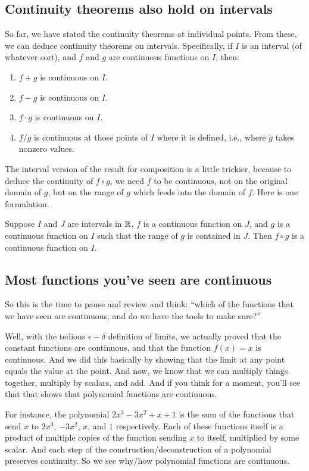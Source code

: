 \documentclass[10pt]{amsart}
\begin{document}
\subsection{Continuity theorems also hold on intervals}

So far, we have stated the continuity theorems at individual
points. From these, we can deduce continuity theorems on
intervals. Specifically, if $I$ is an interval (of whatever sort), and
$f$ and $g$ are continuous functions on $I$, then:

\begin{enumerate}
\item $f + g$ is continuous on $I$.
\item $f - g$ is continuous on $I$.
\item $f \cdot g$ is continuous on $I$.
\item $f/g$ is continuous at those points of $I$ where it is defined,
  i.e., where $g$ takes nonzero values.
\end{enumerate}

The interval version of the result for composition is a little
trickier, because to deduce the continuity of $f \circ g$, we need $f$
to be continuous, not on the original domain of $g$, but on the range
of $g$ which feeds into the domain of $f$. Here is one formulation.

Suppose $I$ and $J$ are intervals in $\mathbb{R}$, $f$ is a continuous
function on $J$, and $g$ is a continuous function on $I$ such that the
range of $g$ is contained in $J$. Then $f \circ g$ is a continuous
function on $I$.
\subsection{Most functions you've seen are continuous}

So this is the time to pause and review and think: ``which of the
functions that we have seen are continuous, and do we have the tools
to make sure?''

Well, with the tedious $\epsilon-\delta$ definition of limits, we
actually proved that the constant functions are continuous, and that
the function $f(x) = x$ is continuous. And we did this basically by
showing that the limit at any point equals the value at the point. And
now, we know that we can multiply things together, multiply by
scalars, and add. And if you think for a moment, you'll see that that
shows that polynomial functions are continuous.

For instance, the polynomial $2x^3 - 3x^2 + x + 1$ is the sum of the
functions that send $x$ to $2x^3$, $-3x^2$, $x$, and $1$
respectively. Each of these functions itself is a product of multiple
copies of the function sending $x$ to itself, multiplied by some
scalar. And each step of the construction/deconstruction of a
polynomial preserves continuity. So we see why/how polynomial
functions are continuous.
\end{document}
